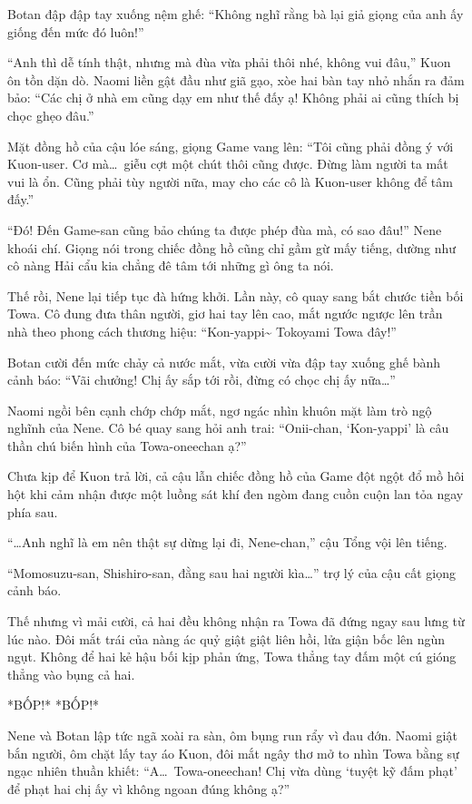 \documentclass[../main.tex]{subfiles}
\begin{document}
Botan đập đập tay xuống nệm ghế: ``Không nghĩ rằng bà lại giả giọng của anh ấy giống đến mức đó luôn!''

``Anh thì dễ tính thật, nhưng mà đùa vừa phải thôi nhé, không vui đâu,'' Kuon ôn tồn dặn dò. Naomi liền gật đầu như giã gạo, xòe hai bàn tay nhỏ nhắn ra đảm bảo: ``Các chị ở nhà em cũng dạy em như thế đấy ạ! Không phải ai cũng thích bị chọc ghẹo đâu.''

Mặt đồng hồ của cậu lóe sáng, giọng Game vang lên: ``Tôi cũng phải đồng ý với Kuon-user. Cơ mà\dots\ giễu cợt một chút thôi cũng được. Đừng làm người ta mất vui là ổn. Cũng phải tùy người nữa, may cho các cô là Kuon-user không để tâm đấy.''

``Đó! Đến Game-san cũng bảo chúng ta được phép đùa mà, có sao đâu!'' Nene khoái chí. Giọng nói trong chiếc đồng hồ cũng chỉ gầm gừ mấy tiếng, dường như cô nàng Hải cẩu kia chẳng đê tâm tới những gì ông ta nói.

Thế rồi, Nene lại tiếp tục đà hứng khởi. Lần này, cô quay sang bắt chước tiền bối Towa. Cô đung đưa thân người, giơ hai tay lên cao, mắt ngước ngược lên trần nhà theo phong cách thương hiệu: ``Kon-yappi\~{} Tokoyami Towa đây!''


Botan cười đến mức chảy cả nước mắt, vừa cười vừa đập tay xuống ghế bành cảnh báo: ``Vãi chưởng! Chị ấy sắp tới rồi, đừng có chọc chị ấy nữa\dots''

Naomi ngồi bên cạnh chớp chớp mắt, ngơ ngác nhìn khuôn mặt làm trò ngộ nghĩnh của Nene. Cô bé quay sang hỏi anh trai: ``Onii-chan, `Kon-yappi' là câu thần chú biến hình của Towa-oneechan ạ?''

Chưa kịp để Kuon trả lời, cả cậu lẫn chiếc đồng hồ của Game đột ngột đổ mồ hôi hột khi cảm nhận được một luồng sát khí đen ngòm đang cuồn cuộn lan tỏa ngay phía sau.

``\dots Anh nghĩ là em nên thật sự dừng lại đi, Nene-chan,'' cậu Tổng vội lên tiếng.

``Momosuzu-san, Shishiro-san, đằng sau hai người kìa\dots'' trợ lý của cậu cất giọng cảnh báo.

Thế nhưng vì mải cười, cả hai đều không nhận ra Towa đã đứng ngay sau lưng từ lúc nào. Đôi mắt trái của nàng ác quỷ giật giật liên hồi, lửa giận bốc lên ngùn ngụt. Không để hai kẻ hậu bối kịp phản ứng, Towa thẳng tay đấm một cú gióng thẳng vào bụng cả hai.

*BỐP!* *BỐP!*


Nene và Botan lập tức ngã xoài ra sàn, ôm bụng run rẩy vì đau đớn. Naomi giật bắn người, ôm chặt lấy tay áo Kuon, đôi mắt ngây thơ mở to nhìn Towa bằng sự ngạc nhiên thuần khiết: ``A\dots\ Towa-oneechan! Chị vừa dùng `tuyệt kỹ đấm phạt' để phạt hai chị ấy vì không ngoan đúng không ạ?''
\end{document}
